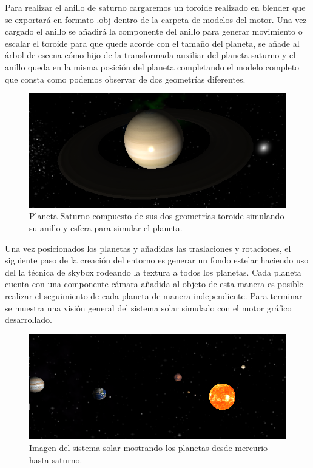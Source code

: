 \documentclass[a4paper, 17pt]{book}
\begin{document}
Para realizar el anillo de saturno cargaremos un toroide realizado en blender que se exportará en formato .obj dentro de la carpeta
de modelos del motor. Una vez cargado el anillo se añadirá la componente del anillo para generar movimiento o escalar el toroide
para que quede acorde con el tamaño del planeta, se añade al árbol de escena cómo hijo de la transformada auxiliar del planeta
saturno y el anillo queda en la misma posición del planeta completando el modelo completo que consta como podemos observar de
dos geometrías diferentes.

\begin{figure}[hbt!]
    \centering
    \includegraphics[scale=0.35, keepaspectratio]{img/saturno.png}
    \caption{Planeta Saturno compuesto de sus dos geometrías toroide simulando su anillo y esfera para simular el planeta.}
    \label{figura:saturno}
\end{figure}

Una vez posicionados los planetas y añadidas las traslaciones y rotaciones, el siguiente paso de la creación del entorno es generar
un fondo estelar haciendo uso del la técnica de skybox rodeando la textura a todos los planetas. Cada planeta cuenta con una
componente cámara añadida al objeto de esta manera es posible realizar el seguimiento de cada planeta de manera independiente.
Para terminar se muestra una visión general del sistema solar simulado con el motor gráfico desarrollado.

\begin{figure}[hbt!]
    \centering
    \includegraphics[scale=0.35, keepaspectratio]{img/SistemaSolar.png}
    \caption{Imagen del sistema solar mostrando los planetas desde mercurio hasta saturno.}
    \label{figura:Earth}
\end{figure}
\end{document}
